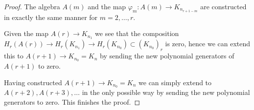 \documentclass{stacks-project}
\theoremstyle{plain}
\theoremstyle{definition}
\theoremstyle{remark}
\numberwithin{equation}{subsection}
\begin{document}
\begin{proof}
\medskip\noindent
The algebra $A(m)$ and the map $\varphi_m : A(m) \to K_{n_{r + 1 - m}}$
are constructed in exactly the same manner for $m = 2, \ldots, r$.

\medskip\noindent
Given the map $A(r) \to K_{n_1}$ we see that the composition
$H_r(A(r)) \to H_r(K_{n_1}) \to H_r(K_{n_0}) \subset (K_{n_0})_r$
is zero, hence we can extend this to $A(r + 1) \to K_{n_0} = K_n$
by sending the new polynomial generators of $A(r + 1)$ to zero.

\medskip\noindent
Having constructed $A(r + 1) \to K_{n_0} = K_n$ we can simply
extend to $A(r + 2), A(r + 3), \ldots$ in the only possible way
by sending the new polynomial generators to zero.
This finishes the proof.
\end{proof}
\end{document}
